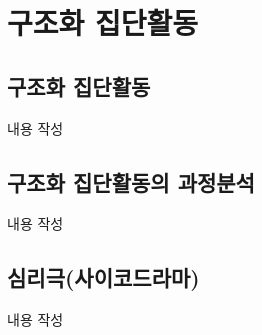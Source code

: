 \section{구조화 집단활동}

\subsection{구조화 집단활동}
내용 작성

\subsection{구조화 집단활동의 과정분석}
내용 작성

\subsection{심리극(사이코드라마)}
내용 작성
